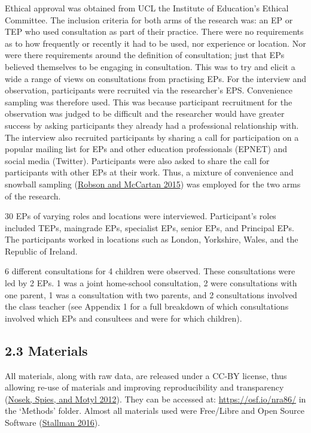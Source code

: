 \documentclass[
]{article}
\begin{document}
Ethical approval was obtained from UCL the Institute of Education's
Ethical Committee. The inclusion criteria for both arms of the research
was: an EP or TEP who used consultation as part of their practice. There
were no requirements as to how frequently or recently it had to be used,
nor experience or location. Nor were there requirements around the
definition of consultation; just that EPs believed themselves to be
engaging in consultation. This was to try and elicit a wide a range of
views on consultations from practising EPs. For the interview and
observation, participants were recruited via the researcher's EPS.
Convenience sampling was therefore used. This was because participant
recruitment for the observation was judged to be difficult and the
researcher would have greater success by asking participants they
already had a professional relationship with. The interview also
recruited participants by sharing a call for participation on a popular
mailing list for EPs and other education professionals (EPNET) and
social media (Twitter). Participants were also asked to share the call
for participants with other EPs at their work. Thus, a mixture of
convenience and snowball sampling
(\protect\hyperlink{ref-robsonRealWorldResearch2015}{Robson and McCartan
2015}) was employed for the two arms of the research.

30 EPs of varying roles and locations were interviewed. Participant's
roles included TEPs, maingrade EPs, specialist EPs, senior EPs, and
Principal EPs. The participants worked in locations such as London,
Yorkshire, Wales, and the Republic of Ireland.

6 different consultations for 4 children were observed. These
consultations were led by 2 EPs. 1 was a joint home-school consultation,
2 were consultations with one parent, 1 was a consultation with two
parents, and 2 consultations involved the class teacher (see Appendix 1
for a full breakdown of which consultations involved which EPs and
consultees and were for which children).

\hypertarget{materials}{%
\subsection{2.3 Materials}\label{materials}}

All materials, along with raw data, are released under a CC-BY license,
thus allowing re-use of materials and improving reproducibility and
transparency
(\protect\hyperlink{ref-nosekScientificUtopiaII2012a}{Nosek, Spies, and
Motyl 2012}). They can be accessed at: \url{https://osf.io/nra86/} in
the `Methods' folder. Almost all materials used were Free/Libre and Open
Source Software (\protect\hyperlink{ref-stallmanFLOSSFOSS2016}{Stallman
2016}).
\end{document}
